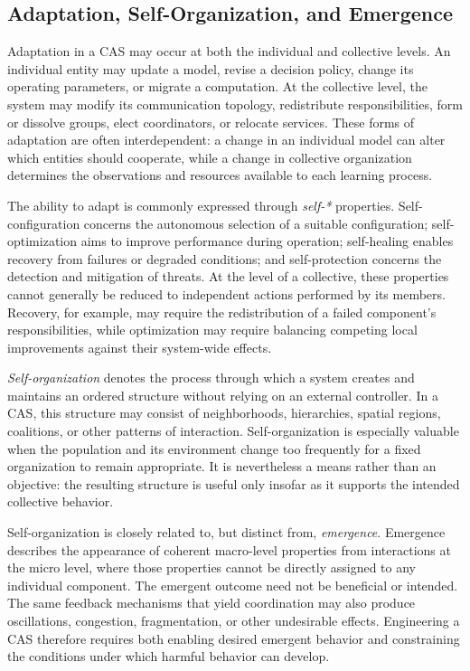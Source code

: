 \subsection{Adaptation, Self-Organization, and Emergence}
\label{subsec:cas-adaptation}

Adaptation in a \gls{CAS} may occur at both the individual and collective levels. 
%
An individual entity may update a model, revise a decision policy, 
 change its operating parameters, or migrate a computation. 
% 
At the collective level, 
 the system may modify its communication topology, redistribute responsibilities,
 form or dissolve groups, elect coordinators, or relocate services. 
% 
These forms of adaptation are often interdependent: 
 a change in an individual model can alter which entities should cooperate, 
 while a change in collective organization determines the observations 
 and resources available to each learning process.

The ability to adapt is commonly expressed through \emph{self-*} properties.
%
Self-configuration concerns the autonomous selection of a suitable configuration; 
 self-optimization aims to improve performance during operation;
 self-healing enables recovery from failures or degraded conditions; and
 self-protection concerns the detection and mitigation of threats. 
% 
At the level of a collective, 
 these properties cannot generally be reduced to independent actions performed by its members. 
% 
Recovery, for example, 
 may require the redistribution of a failed component's responsibilities, 
 while optimization may require balancing competing local improvements 
 against their system-wide effects.

\emph{Self-organization} 
 denotes the process through which a system creates 
 and maintains an ordered structure without relying on an external controller. 
% 
In a \gls{CAS}, 
 this structure may consist of neighborhoods, hierarchies, spatial regions, coalitions, 
 or other patterns of interaction. 
% 
Self-organization is especially valuable when the population 
 and its environment change too frequently for a fixed organization to remain appropriate. 
% 
It is nevertheless a means rather than an objective: 
 the resulting structure is useful only insofar as it supports the intended collective behavior.

Self-organization is closely related to, but distinct from, \emph{emergence}.
%
Emergence describes the appearance of coherent macro-level properties 
 from interactions at the micro level, 
 where those properties cannot be directly assigned to any individual component. 
% 
The emergent outcome need not be beneficial or intended. 
%
The same feedback mechanisms that yield coordination may also produce 
oscillations, congestion, fragmentation, or other undesirable effects. 
%
Engineering a \gls{CAS} therefore requires both enabling desired emergent
 behavior and constraining the conditions under which harmful behavior can develop.


